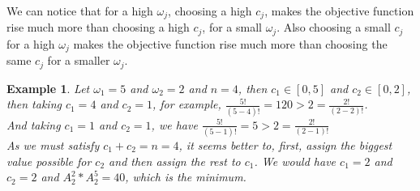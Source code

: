 \documentclass[jair,twoside,11pt,theapa]{article}
\newtheorem{example}[theorem]{Example}
\begin{document}
We can notice that for a high $\omega_j$, choosing a high $c_j$, makes the objective function rise much more than choosing a high $c_j$, for a small $\omega_j$. Also choosing a small $c_j$ for a high $\omega_j$ makes the objective function rise much more than choosing the same $c_j$ for a smaller $\omega_j$.

\begin{example}
Let $\omega_1=5$ and $\omega_2=2$ and $n=4$, then $c_1 \in [0,5]$ and $c_2 \in [0,2]$, then taking $c_1=4$ and $c_2=1$, for example, $\frac{5!}{(5-4)!}=120 > 2 = \frac{2!}{(2-2)!}$. \\	
And taking $c_1=1$ and $c_2=1$, we have $\frac{5!}{(5-1)!}=5 > 2= \frac{2!}{(2-1)!}$ \\
As we must satisfy $c_1+ c_2= n = 4$, it seems better to, first, assign the biggest value possible for $c_2$ and then assign the rest to $c_1$. We would have $c_1=2$ and $c_2=2$ and $A^2_2 * A^5_2 = 40$, which is the minimum.
\end{example}
\end{document}
